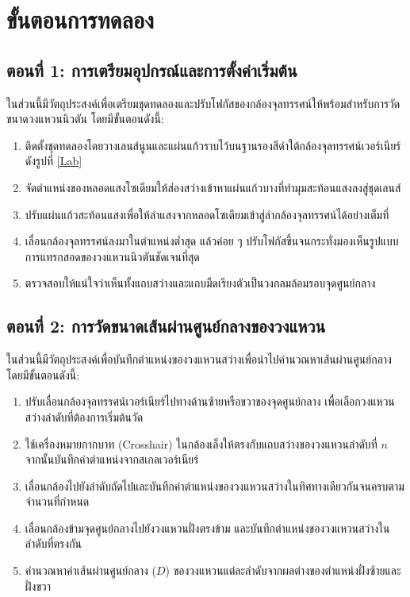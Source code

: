 \documentclass[11pt,a4paper]{article}
\begin{document}
\section{ขั้นตอนการทดลอง} \label{procedure}

\subsection*{ตอนที่ 1: การเตรียมอุปกรณ์และการตั้งค่าเริ่มต้น}
ในส่วนนี้มีวัตถุประสงค์เพื่อเตรียมชุดทดลองและปรับโฟกัสของกล้องจุลทรรศน์ให้พร้อมสำหรับการวัดขนาดวงแหวนนิวตัน โดยมีขั้นตอนดังนี้:
\begin{enumerate}
    \item ติดตั้งชุดทดลองโดยวางเลนส์นูนและแผ่นแก้วราบไว้บนฐานรองสีดำใต้กล้องจุลทรรศน์เวอร์เนียร์ดังรูปที่ \ref{Lab}
    \item จัดตำแหน่งของหลอดแสงโซเดียมให้ส่องสว่างเข้าหาแผ่นแก้วบางที่ทำมุมสะท้อนแสงลงสู่ชุดเลนส์
    \item ปรับแผ่นแก้วสะท้อนแสงเพื่อให้ลำแสงจากหลอดโซเดียมเข้าสู่ลำกล้องจุลทรรศน์ได้อย่างเต็มที่
    \item เลื่อนกล้องจุลทรรศน์ลงมาในตำแหน่งต่ำสุด แล้วค่อย ๆ ปรับโฟกัสขึ้นจนกระทั่งมองเห็นรูปแบบการแทรกสอดของวงแหวนนิวตันชัดเจนที่สุด
    \item ตรวจสอบให้แน่ใจว่าเห็นทั้งแถบสว่างและแถบมืดเรียงตัวเป็นวงกลมล้อมรอบจุดศูนย์กลาง
\end{enumerate}



\subsection*{ตอนที่ 2: การวัดขนาดเส้นผ่านศูนย์กลางของวงแหวน}
ในส่วนนี้มีวัตถุประสงค์เพื่อบันทึกตำแหน่งของวงแหวนสว่างเพื่อนำไปคำนวณหาเส้นผ่านศูนย์กลาง โดยมีขั้นตอนดังนี้:
\begin{enumerate}
    \item ปรับเลื่อนกล้องจุลทรรศน์เวอร์เนียร์ไปทางด้านซ้ายหรือขวาของจุดศูนย์กลาง เพื่อเลือกวงแหวนสว่างลำดับที่ต้องการเริ่มต้นวัด
    \item ใช้เครื่องหมายกากบาท (Crosshair) ในกล้องเล็งให้ตรงกับแถบสว่างของวงแหวนลำดับที่ $n$ จากนั้นบันทึกค่าตำแหน่งจากสเกลเวอร์เนียร์
    \item เลื่อนกล้องไปยังลำดับถัดไปและบันทึกค่าตำแหน่งของวงแหวนสว่างในทิศทางเดียวกันจนครบตามจำนวนที่กำหนด
    \item เลื่อนกล้องข้ามจุดศูนย์กลางไปยังวงแหวนฝั่งตรงข้าม และบันทึกตำแหน่งของวงแหวนสว่างในลำดับที่ตรงกัน
    \item คำนวณหาค่าเส้นผ่านศูนย์กลาง ($D$) ของวงแหวนแต่ละลำดับจากผลต่างของตำแหน่งฝั่งซ้ายและฝั่งขวา
\end{enumerate}
\end{document}
